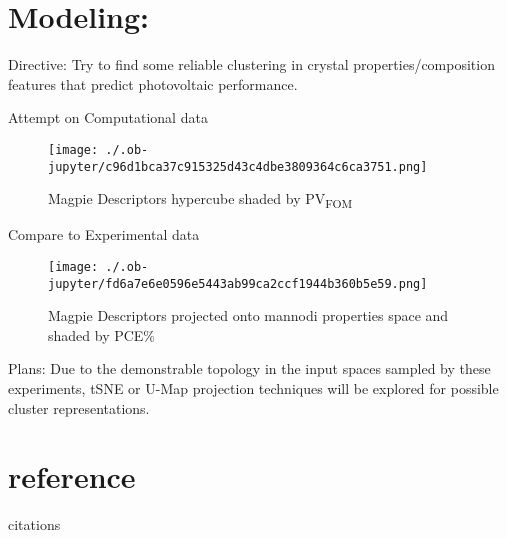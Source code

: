 \documentclass[8pt, compress]{beamer}
\begin{document}
\section{Modeling:}
\label{sec:org1a61c45}
\begin{frame}[allowframebreaks]{Directive:}
Try to find some reliable clustering in crystal properties/composition
features that predict photovoltaic performance.
\begin{block}{Attempt on Computational data}
\begin{figure}[htbp]
\centering
\texttt{[image: ./.ob-jupyter/c96d1bca37c915325d43c4dbe3809364c6ca3751.png]}
\caption{\label{fig:prop_top} Magpie Descriptors hypercube shaded by PV\textsubscript{FOM}}
\end{figure}
\end{block}
\begin{block}{Compare to Experimental data}
\begin{figure}[htbp]
\centering
\texttt{[image: ./.ob-jupyter/fd6a7e6e0596e5443ab99ca2ccf1944b360b5e59.png]}
\caption{\label{fig:prop_top} Magpie Descriptors projected onto mannodi properties space and shaded by PCE\%}
\end{figure}
\end{block}
\end{frame}

\begin{frame}[label={sec:org5ab196f}]{Plans:}
Due to the demonstrable topology in the input spaces sampled by these
experiments, tSNE or U-Map projection techniques will be explored for
possible cluster representations.
\end{frame}
\section{reference}
\label{sec:org60baee8}
\begin{frame}[label={sec:org3354546}]{citations}


\end{frame}
\end{document}
